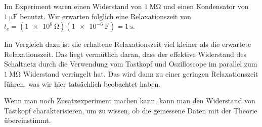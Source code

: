	Im Experiment waren einen Widerstand von $\SI{1}{\mega\ohm}$ und einen Kondensator von $\SI{1}{\micro\farad}$ benutzt. Wir erwarten folglich eine Relaxationszeit von $t_e = (\SI{1e6}{\ohm})(\SI{1e-6}{\farad}) = \SI{1}{\second}$.

	Im Vergleich dazu ist die erhaltene Relaxationszeit viel kleiner als die erwartete Relaxationszeit. Das liegt vermütlich daran, dass der effektive Widerstand des Schaltnetz durch die Verwendung vom Tastkopf und Oszilloscope im parallel zum $\SI{1}{\mega\ohm}$ Widerstand verringelt hat. Das wird dann zu einer geringen Relaxationszeit führen, was wir hier tatsächlich beobachtet haben. 

	Wenn man noch Zusatzexperiment machen kann, kann man den Widerstand von Tastkopf charakterisieren, um zu wissen, ob die gemessene Daten mit der Theorie übereinstimmt. 